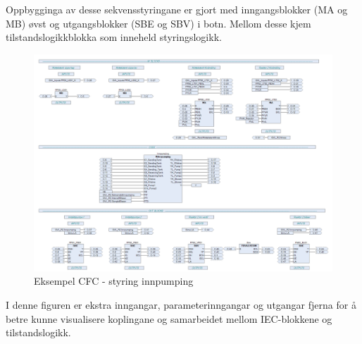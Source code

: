 Oppbygginga av desse sekvensstyringane er gjort med inngangsblokker (\gls{MA} og \gls{MB}) øvst og utgangsblokker (\gls{SBE} og \gls{SBV}) i botn.
Mellom desse kjem tilstandslogikkblokka som inneheld styringslogikk.

\begin{figure}[htbp]
    \centering
    \includegraphics[width=1\textwidth]{Bilder/Heile_innpump.png}
    \caption{Eksempel \gls{CFC} - styring innpumping}\label{fig:CFCInnpumping}
\end{figure}

I denne figuren er ekstra inngangar, parameterinngangar og utgangar fjerna for å betre kunne visualisere koplingane og samarbeidet mellom
\gls{IEC}-blokkene og tilstandslogikk.

\newpage

